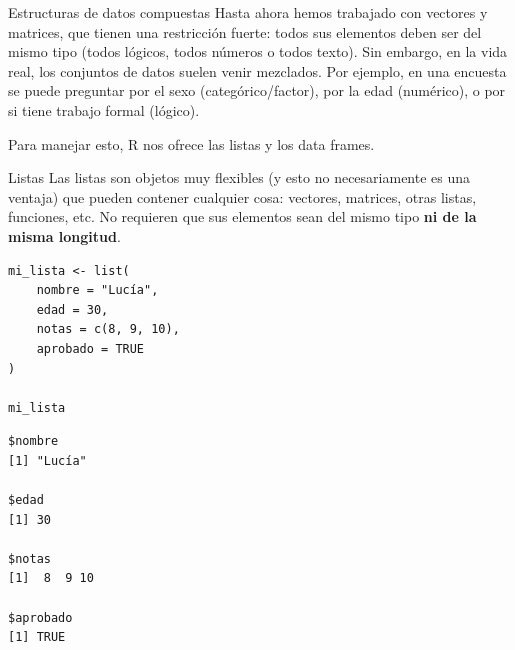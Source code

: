 \documentclass[8pt]{beamer}
\begin{document}
	
	
	
	
	\begin{frame}[fragile]{Estructuras de datos compuestas}
Hasta ahora hemos trabajado con vectores y matrices, que tienen una restricción fuerte: todos sus elementos deben ser del mismo tipo (todos lógicos, todos números o todos texto). Sin embargo, en la vida real, los conjuntos de datos suelen venir mezclados. Por ejemplo, en una encuesta se puede preguntar por el sexo (categórico/factor), por la edad (numérico), o por si tiene trabajo formal (lógico).

Para manejar esto, R nos ofrece las listas y los data frames.
	\end{frame}
	
	
	
	
	
	\begin{frame}[fragile]{Listas}
Las listas son objetos muy flexibles (y esto no necesariamente es una ventaja) que pueden contener cualquier cosa: vectores, matrices, otras listas, funciones, etc. No requieren que sus elementos sean del mismo tipo \textbf{ni de la misma longitud}.

\begin{lstlisting}[style=RScript]
mi_lista <- list(
	nombre = "Lucía",
	edad = 30,
	notas = c(8, 9, 10),
	aprobado = TRUE
)

mi_lista
\end{lstlisting}
\begin{lstlisting}[style=RConsole]
$nombre
[1] "Lucía"

$edad
[1] 30

$notas
[1]  8  9 10

$aprobado
[1] TRUE
\end{lstlisting}
	\end{frame}
	
	
	
\end{document}
